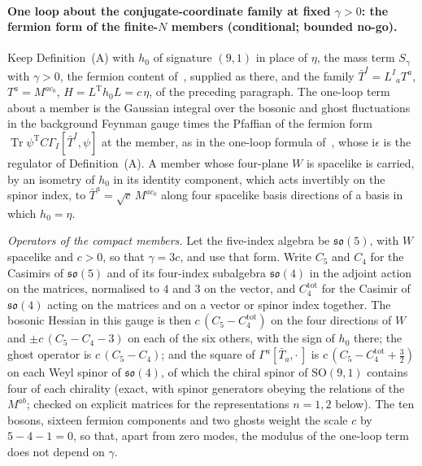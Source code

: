 \paragraph{One loop about the conjugate-coordinate family at fixed \(\gamma>0\): the fermion form of the finite-\(N\) members (conditional; bounded no-go).}
Keep Definition~(A) with \(h_0\) of signature \((9,1)\) in place of \(\eta\), the mass term \(S_\gamma\) with \(\gamma>0\), the fermion content of~\cite{IKKT1997}, supplied as there, and the family \(\bar T^I=L^I{}_aT^a\), \(T^a=M^{ac_0}\), \(H=L^{\mathrm T}h_0L=c\,\eta\), of the preceding paragraph. The one-loop term about a member is the Gaussian integral over the bosonic and ghost fluctuations in the background Feynman gauge times the Pfaffian of the fermion form \(\operatorname{Tr}\psi^{\mathrm T}C\Gamma_I[\bar T^I,\psi]\) at the member, as in the one-loop formula of~\cite{Steinacker2023}, whose \(\mathrm i\epsilon\) is the regulator of Definition~(A). A member whose four-plane \(W\) is spacelike is carried, by an isometry of \(h_0\) in its identity component, which acts invertibly on the spinor index, to \(\bar T^a=\sqrt c\,M^{ac_0}\) along four spacelike basis directions of a basis in which \(h_0=\eta\).

\emph{Operators of the compact members.} Let the five-index algebra be \(\mathfrak{so}(5)\), with \(W\) spacelike and \(c>0\), so that \(\gamma=3c\), and use that form. Write \(C_5\) and \(C_4\) for the Casimirs of \(\mathfrak{so}(5)\) and of its four-index subalgebra \(\mathfrak{so}(4)\) in the adjoint action on the matrices, normalised to \(4\) and \(3\) on the vector, and \(C_4^{\mathrm{tot}}\) for the Casimir of \(\mathfrak{so}(4)\) acting on the matrices and on a vector or spinor index together. The bosonic Hessian in this gauge is then \(c\,(C_5-C_4^{\mathrm{tot}})\) on the four directions of \(W\) and \(\pm c\,(C_5-C_4-3)\) on each of the six others, with the sign of \(h_0\) there; the ghost operator is \(c\,(C_5-C_4)\); and the square of \(\Gamma^a[\bar T_a,\cdot\,]\) is \(c\,(C_5-C_4^{\mathrm{tot}}+\tfrac32)\) on each Weyl spinor of \(\mathfrak{so}(4)\), of which the chiral spinor of \(\mathrm{SO}(9,1)\) contains four of each chirality (exact, with spinor generators obeying the relations of the \(M^{ab}\); checked on explicit matrices for the representations \(n=1,2\) below). The ten bosons, sixteen fermion components and two ghosts weight the scale \(c\) by \(5-4-1=0\), so that, apart from zero modes, the modulus of the one-loop term does not depend on \(\gamma\).

